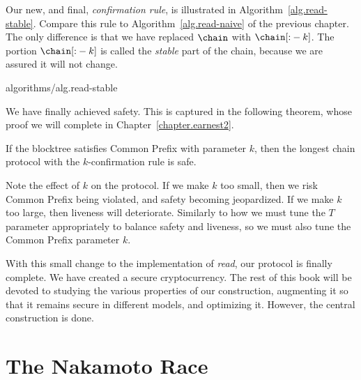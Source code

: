 Our new, and final, \emph{confirmation rule}, is illustrated in
Algorithm~\ref{alg.read-stable}. Compare this rule to Algorithm~\ref{alg.read-naive} of
the previous chapter. The only difference is that we have replaced $\chain$ with $\chain[{:}-k]$.
The portion $\chain[{:}-k]$ is called the \emph{stable} part of the chain, because we
are assured it will not change.

{algorithms/alg.read-stable}

We have finally achieved safety. This is captured in the following theorem, whose proof we will
complete in Chapter~\ref{chapter.earnest2}.

\begin{theorem}
    If the blocktree satisfies Common Prefix with parameter $k$, then the longest chain protocol
    with the $k$-confirmation rule is safe.
\end{theorem}

Note the effect of $k$ on the protocol. If we make $k$ too small, then we risk Common Prefix
being violated, and safety becoming jeopardized. If we make $k$ too large, then liveness will
deteriorate. Similarly to how we must tune the $T$ parameter appropriately to balance safety
and liveness, so we must also tune the Common Prefix parameter $k$.

With this small change to the implementation of \emph{read}, our protocol is finally complete.
We have created a secure cryptocurrency. The rest of this book will be devoted to studying the
various properties of our construction, augmenting it so that it remains secure in different models,
and optimizing it. However, the central construction is done.

\section{The Nakamoto Race}

